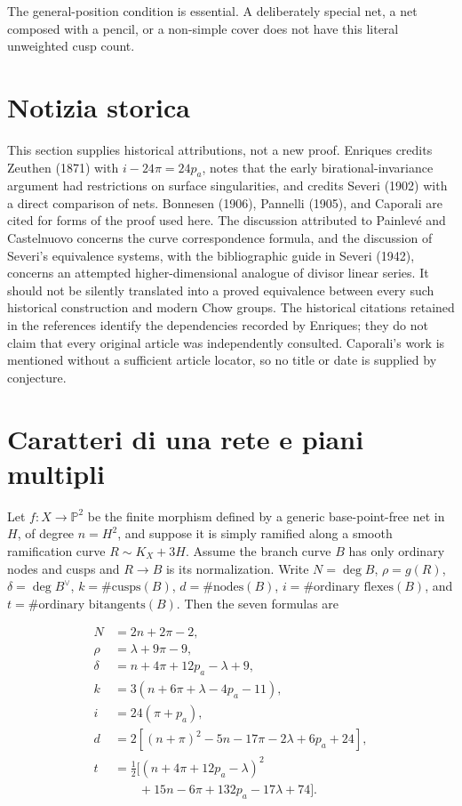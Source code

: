 The general-position condition is essential. A deliberately special net, a net composed with a pencil, or a non-simple cover does not have this literal unweighted cusp count.

\section{Notizia storica}
\label{cp1-v-5}

This section supplies historical attributions, not a new proof. Enriques credits Zeuthen (1871) with \(i-24\pi=24p_a\), notes that the early birational-invariance argument had restrictions on surface singularities, and credits Severi (1902) with a direct comparison of nets. Bonnesen (1906), Pannelli (1905), and Caporali are cited for forms of the proof used here. The discussion attributed to Painlevé and Castelnuovo concerns the curve correspondence formula, and the discussion of Severi's equivalence systems, with the bibliographic guide in Severi (1942), concerns an attempted higher-dimensional analogue of divisor linear series. It should not be silently translated into a proved equivalence between every such historical construction and modern Chow groups. The historical citations retained in the references identify the dependencies recorded by Enriques; they do not claim that every original article was independently consulted. Caporali's work is mentioned without a sufficient article locator, so no title or date is supplied by conjecture.

\section{Caratteri di una rete e piani multipli}
\label{cp1-v-6}

Let \(f:X\to\mathbb P^2\) be the finite morphism defined by a generic base-point-free net in \(H\), of degree \(n=H^2\), and suppose it is simply ramified along a smooth ramification curve \(R\sim K_X+3H\). Assume the branch curve \(B\) has only ordinary nodes and cusps and \(R\to B\) is its normalization. Write \(N=\deg B\), \(\rho=g(R)\), \(\delta=\deg B^\vee\), \(k=\#\text{cusps}(B)\), \(d=\#\text{nodes}(B)\), \(i=\#\text{ordinary flexes}(B)\), and \(t=\#\text{ordinary bitangents}(B)\). Then the seven formulas are

\[
\begin{aligned}
N&=2n+2\pi-2,\\
\rho&=\lambda+9\pi-9,\\
\delta&=n+4\pi+12p_a-\lambda+9,\\
k&=3(n+6\pi+\lambda-4p_a-11),\\
i&=24(\pi+p_a),\\
d&=2[(n+\pi)^2-5n-17\pi-2\lambda+6p_a+24],\\
t&=\tfrac12\bigl[(n+4\pi+12p_a-\lambda)^2\\
 &\qquad{}+15n-6\pi+132p_a-17\lambda+74\bigr].
\end{aligned} \tag{V.6.1}
\]

